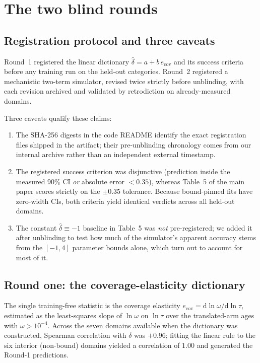\documentclass[10pt,letterpaper]{article}
\newcommand{\ecov}{e_{\mathrm{cov}}}
\begin{document}
\section{The two blind rounds}
\label{sup:blind}

\subsection{Registration protocol and three caveats}

Round~1 registered the linear dictionary $\hat\delta = a + b\,\ecov$ and its
success criteria before any training run on the held-out categories.
Round~2 registered a mechanistic two-term simulator, revised twice strictly
before unblinding, with each revision archived and validated by retrodiction
on already-measured domains.

Three caveats qualify these claims:

\begin{enumerate}
\item The SHA-256 digests in the code README identify the exact registration
      files shipped in the artifact; their pre-unblinding chronology comes from
      our internal archive rather than an independent external timestamp.
\item The registered success criterion was disjunctive (prediction inside
      the measured 90\% CI \emph{or} absolute error $< 0.35$), whereas
      Table~5 of the main paper scores strictly on the $\pm 0.35$ tolerance.
      Because bound-pinned fits have zero-width CIs, both criteria yield
      identical verdicts across all held-out domains.
\item The constant $\hat\delta \equiv -1$ baseline in Table~5
      was \emph{not} pre-registered; we added it after unblinding to test
      how much of the simulator's apparent accuracy stems from the $[-1, 4]$
      parameter bounds alone, which turn out to account for most of it.
\end{enumerate}

\subsection{Round one: the coverage-elasticity dictionary}

The single training-free statistic is the coverage elasticity
$\ecov = \mathrm{d}\ln \omega / \mathrm{d}\ln\tau$, estimated as the
least-squares slope of $\ln \omega$ on $\ln\tau$ over the translated-arm ages
with $\omega > 10^{-4}$. Across the seven domains available when the dictionary
was constructed, Spearman correlation with $\delta$ was $+0.96$; fitting the
linear rule to the six interior (non-bound) domains yielded a correlation of
$1.00$ and generated the Round-1 predictions.
\end{document}
